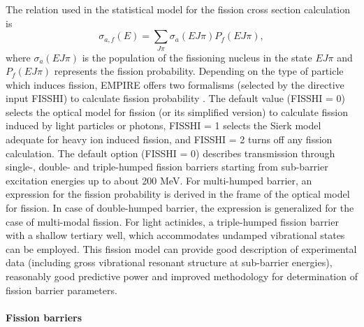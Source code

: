The relation used in the statistical model for the fission cross section
calculation is
\begin{equation}
\sigma_{a,f}(E)=\sum_{J\pi}\sigma_{a}(EJ\pi)P_{f}(EJ\pi),
\end{equation}
\noindent where $\sigma_{a}(EJ\pi)$ is the population of the fissioning
nucleus in the state $EJ\pi$ and $P_{f}(EJ\pi)$ represents the fission
probability. Depending on the type of particle which induces fission, EMPIRE
offers two formalisms (selected by the directive input FISSHI) to calculate
fission probability . The default value (FISSHI = 0) selects the optical
model for fission (or its simplified version) to calculate fission induced
by light particles or photons, FISSHI = 1 selects the Sierk model adequate
for heavy ion induced fission, and FISSHI = 2 turns off any fission
calculation. The default option (FISSHI = 0) describes transmission through
single-, double- and triple-humped fission barriers starting from
sub-barrier excitation energies up to about 200 MeV. For multi-humped
barrier, an expression for the fission probability is derived in the frame
of the optical model for fission. In case of double-humped barrier, the
expression is generalized for the case of multi-modal fission. For light
actinides, a triple-humped fission barrier with a shallow tertiary well,
which accommodates undamped vibrational states can be employed. This fission
model can provide good description of experimental data (including gross
vibrational resonant structure at sub-barrier energies), reasonably good
predictive power and improved methodology for determination of fission
barrier parameters.

\paragraph{Fission barriers}

